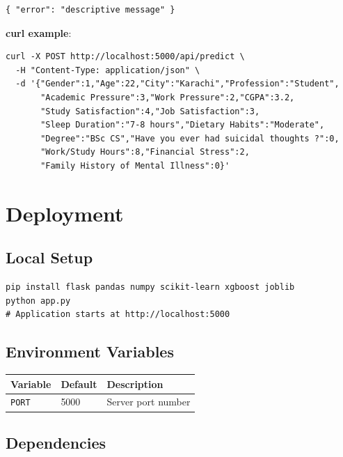 \documentclass[11pt,a4paper]{article}
\begin{document}
\begin{lstlisting}[style=py]
{ "error": "descriptive message" }
\end{lstlisting}

\textbf{curl example}:

\begin{lstlisting}[style=bash]
curl -X POST http://localhost:5000/api/predict \
  -H "Content-Type: application/json" \
  -d '{"Gender":1,"Age":22,"City":"Karachi","Profession":"Student",
       "Academic Pressure":3,"Work Pressure":2,"CGPA":3.2,
       "Study Satisfaction":4,"Job Satisfaction":3,
       "Sleep Duration":"7-8 hours","Dietary Habits":"Moderate",
       "Degree":"BSc CS","Have you ever had suicidal thoughts ?":0,
       "Work/Study Hours":8,"Financial Stress":2,
       "Family History of Mental Illness":0}'
\end{lstlisting}

\section{Deployment}

\subsection{Local Setup}

\begin{lstlisting}[style=bash]
pip install flask pandas numpy scikit-learn xgboost joblib
python app.py
# Application starts at http://localhost:5000
\end{lstlisting}

\subsection{Environment Variables}

\begin{tabularx}{\textwidth}{l l X}
\hline
\textbf{Variable} & \textbf{Default} & \textbf{Description} \\
\hline
\texttt{PORT} & 5000 & Server port number \\
\hline
\end{tabularx}

\subsection{Dependencies}
\end{document}
